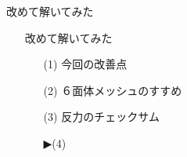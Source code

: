 \begin{frame}{改めて解いてみた}
  \begin{itemize}
      \item[] 改めて解いてみた
      \begin{itemize}[itemsep=1.3ex, leftmargin=1cm]
        \item[(1)]  {\color{cud_lightgray}今回の改善点}
	\item[(2)]  {\color{cud_lightgray}６面体メッシュのすすめ}
	\item[(3)]  {\color{cud_lightgray}反力のチェックサム}
	\item[▶(4)] 
      \end{itemize}
  \end{itemize}
\end{frame}
